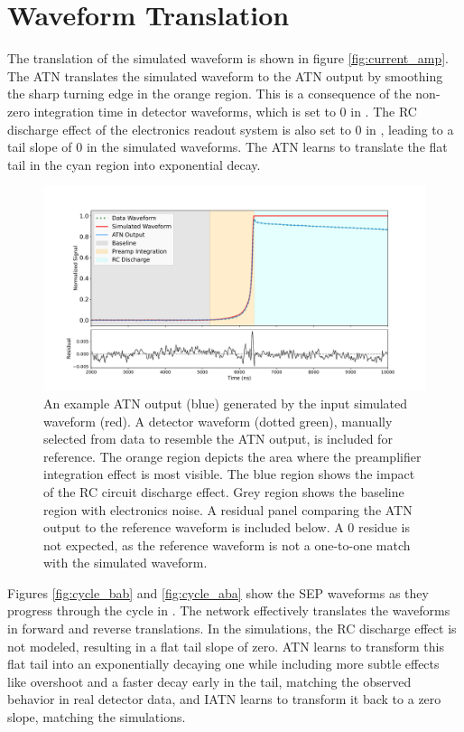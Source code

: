 \section{Waveform Translation}
The translation of the simulated waveform is shown in figure \ref{fig:current_amp}. The ATN translates the simulated waveform to the ATN output by smoothing the sharp turning edge in the orange region. This is a consequence of the non-zero integration time in detector waveforms, which is set to $0$ in {\siggen}. The RC discharge effect of the electronics readout system is also set to 0 in {\siggen}, leading to a tail slope of 0 in the simulated waveforms. The ATN learns to translate the flat tail in the cyan region into exponential decay.

\begin{figure}[htb!]
    \includegraphics[width=\linewidth,trim={2.0cm 0pc 3.0cm 0pc},clip]{ch8/figs/wf_comp_sim_atn_data.pdf}
    \caption{An example ATN output (blue) generated by the input simulated waveform (red). A detector waveform (dotted green), manually selected from data to resemble the ATN output, is included for reference. The orange region depicts the area where the preamplifier integration effect is most visible. The blue region shows the impact of the RC circuit discharge effect. Grey region shows the baseline region with electronics noise. A residual panel comparing the ATN output to the reference waveform is included below. A 0 residue is not expected, as the reference waveform is not a one-to-one match with the simulated waveform.} 

   \label{fig:sample_result}
\end{figure}

Figures \ref{fig:cycle_bab} and \ref{fig:cycle_aba} show the SEP waveforms as they progress through the cycle in {\cpunet}. The network effectively translates the waveforms in forward and reverse translations. In the {\siggen} simulations, the RC discharge effect is not modeled, resulting in a flat tail slope of zero. ATN learns to transform this flat tail into an exponentially decaying one while including more subtle effects like overshoot and a faster decay early in the tail, matching the observed behavior in real detector data, and IATN learns to transform it back to a zero slope, matching the simulations.

